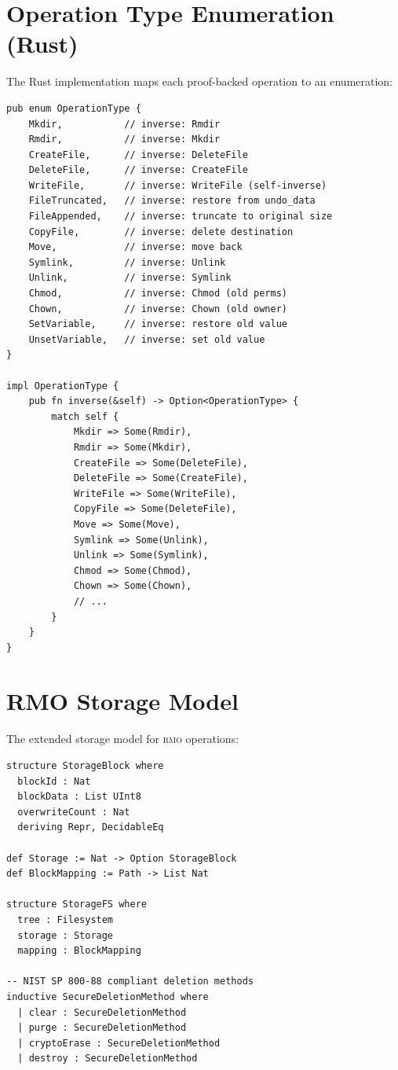 \documentclass[11pt,a4paper]{article}
\newcommand{\rmo}{\textsc{rmo}}
\begin{document}
\section{Operation Type Enumeration (Rust)}
\label{app:optypes}

The Rust implementation maps each proof-backed operation to an enumeration:

\begin{lstlisting}[style=ruststyle,caption={Operation types with their proven inverses.}]
pub enum OperationType {
    Mkdir,           // inverse: Rmdir
    Rmdir,           // inverse: Mkdir
    CreateFile,      // inverse: DeleteFile
    DeleteFile,      // inverse: CreateFile
    WriteFile,       // inverse: WriteFile (self-inverse)
    FileTruncated,   // inverse: restore from undo_data
    FileAppended,    // inverse: truncate to original size
    CopyFile,        // inverse: delete destination
    Move,            // inverse: move back
    Symlink,         // inverse: Unlink
    Unlink,          // inverse: Symlink
    Chmod,           // inverse: Chmod (old perms)
    Chown,           // inverse: Chown (old owner)
    SetVariable,     // inverse: restore old value
    UnsetVariable,   // inverse: set old value
}

impl OperationType {
    pub fn inverse(&self) -> Option<OperationType> {
        match self {
            Mkdir => Some(Rmdir),
            Rmdir => Some(Mkdir),
            CreateFile => Some(DeleteFile),
            DeleteFile => Some(CreateFile),
            WriteFile => Some(WriteFile),
            CopyFile => Some(DeleteFile),
            Move => Some(Move),
            Symlink => Some(Unlink),
            Unlink => Some(Symlink),
            Chmod => Some(Chmod),
            Chown => Some(Chown),
            // ...
        }
    }
}
\end{lstlisting}

\section{RMO Storage Model}
\label{app:rmo}

The extended storage model for \rmo{} operations:

\begin{lstlisting}[style=leanstyle,caption={Storage layer for RMO.}]
structure StorageBlock where
  blockId : Nat
  blockData : List UInt8
  overwriteCount : Nat
  deriving Repr, DecidableEq

def Storage := Nat -> Option StorageBlock
def BlockMapping := Path -> List Nat

structure StorageFS where
  tree : Filesystem
  storage : Storage
  mapping : BlockMapping

-- NIST SP 800-88 compliant deletion methods
inductive SecureDeletionMethod where
  | clear : SecureDeletionMethod
  | purge : SecureDeletionMethod
  | cryptoErase : SecureDeletionMethod
  | destroy : SecureDeletionMethod
\end{lstlisting}
\end{document}
